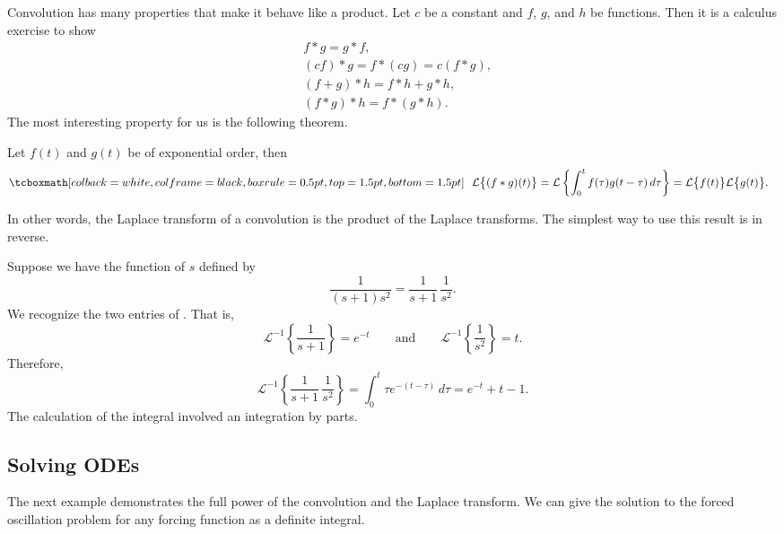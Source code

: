 Convolution has many properties that make it behave like a product.
Let $c$ be a constant and $f$, $g$, and $h$ be functions.  Then it is a
calculus exercise to show
\begin{align*}
& f * g = g * f , \\
& (c f) * g = f * (c g) = c (f*g) , \\
& (f+g) * h = f * h + g * h , \\
& ( f * g ) * h = f * ( g * h ) .
\end{align*}
The most interesting property for us is the following theorem.

\begin{theorem}
Let $f(t)$ and $g(t)$ be of exponential order, then
\begin{equation*}
\mybxbg{~~
\mathcal{L} \bigl\{ (f*g)(t) \bigr\}
=
\mathcal{L} \left\{ \int_0^t f(\tau) g(t-\tau) \, d\tau \right\}
=
\mathcal{L} \bigl\{ f(t) \bigr\} \mathcal{L} \bigl\{ g(t) \bigr\} .
~~}
\end{equation*}
\end{theorem}

In other words, the Laplace transform of a convolution is the product
of the Laplace transforms.  The simplest way to use this result is in
reverse.

\begin{example}
Suppose we have the function of $s$
defined by
\begin{equation*}
\frac{1}{(s+1)s^2} = 
\frac{1}{s+1}\,
\frac{1}{s^2} .
\end{equation*}
We recognize the two entries of .  That is,
\begin{equation*}
\mathcal{L}^{-1} 
\left\{
\frac{1}{s+1} \right\}
= e^{-t}
\qquad \text{and} \qquad
\mathcal{L}^{-1} 
\left\{
\frac{1}{s^2} \right\} 
= t.
\end{equation*}
Therefore,
\begin{equation*}
\mathcal{L}^{-1}
\left\{
\frac{1}{s+1}\,
\frac{1}{s^2} \right\}
=
\int_0^t
\tau e^{-(t-\tau)} \,d\tau
=
e^{-t}+t-1 .
\end{equation*}
The calculation of the integral involved an integration by parts.
\end{example}

\subsection{Solving ODEs}

The next example demonstrates the full power of the convolution and
the Laplace transform.  We can give the solution to
the forced oscillation problem for any forcing function as a definite
integral.

